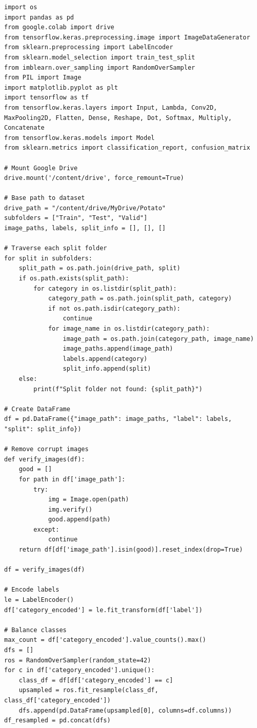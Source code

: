 \documentclass{article}
\begin{document}
\lstset{language=Python, basicstyle=\ttfamily\small, breaklines=true, frame=single, numbers=left}
\begin{lstlisting}
import os
import pandas as pd
from google.colab import drive
from tensorflow.keras.preprocessing.image import ImageDataGenerator
from sklearn.preprocessing import LabelEncoder
from sklearn.model_selection import train_test_split
from imblearn.over_sampling import RandomOverSampler
from PIL import Image
import matplotlib.pyplot as plt
import tensorflow as tf
from tensorflow.keras.layers import Input, Lambda, Conv2D, MaxPooling2D, Flatten, Dense, Reshape, Dot, Softmax, Multiply, Concatenate
from tensorflow.keras.models import Model
from sklearn.metrics import classification_report, confusion_matrix

# Mount Google Drive
drive.mount('/content/drive', force_remount=True)

# Base path to dataset
drive_path = "/content/drive/MyDrive/Potato"
subfolders = ["Train", "Test", "Valid"]
image_paths, labels, split_info = [], [], []

# Traverse each split folder
for split in subfolders:
    split_path = os.path.join(drive_path, split)
    if os.path.exists(split_path):
        for category in os.listdir(split_path):
            category_path = os.path.join(split_path, category)
            if not os.path.isdir(category_path):
                continue
            for image_name in os.listdir(category_path):
                image_path = os.path.join(category_path, image_name)
                image_paths.append(image_path)
                labels.append(category)
                split_info.append(split)
    else:
        print(f"Split folder not found: {split_path}")

# Create DataFrame
df = pd.DataFrame({"image_path": image_paths, "label": labels, "split": split_info})

# Remove corrupt images
def verify_images(df):
    good = []
    for path in df['image_path']:
        try:
            img = Image.open(path)
            img.verify()
            good.append(path)
        except:
            continue
    return df[df['image_path'].isin(good)].reset_index(drop=True)

df = verify_images(df)

# Encode labels
le = LabelEncoder()
df['category_encoded'] = le.fit_transform(df['label'])

# Balance classes
max_count = df['category_encoded'].value_counts().max()
dfs = []
ros = RandomOverSampler(random_state=42)
for c in df['category_encoded'].unique():
    class_df = df[df['category_encoded'] == c]
    upsampled = ros.fit_resample(class_df, class_df['category_encoded'])
    dfs.append(pd.DataFrame(upsampled[0], columns=df.columns))
df_resampled = pd.concat(dfs)


\end{lstlisting}
\end{document}
